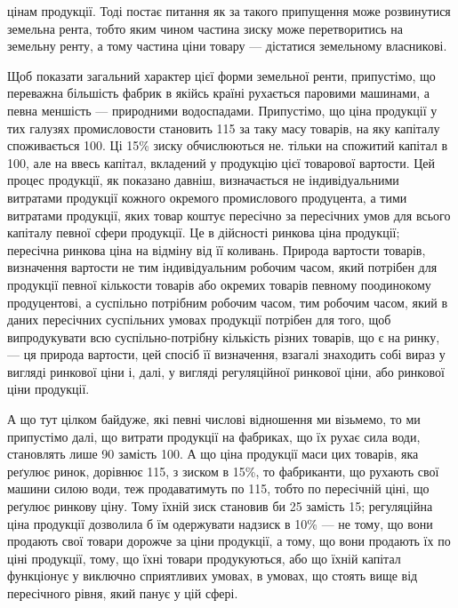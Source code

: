 \parcont{}  %
цінам продукції. Тоді постає питання як за такого припущення може розвинутися
земельна рента, тобто яким чином частина зиску може перетворитись на земельну
ренту, а тому частина ціни товару — дістатися земельному власникові.

Щоб показати загальний характер цієї форми земельної ренти, припустімо,
що переважна більшість фабрик в якійсь країні рухається паровими машинами,
а певна меншість — природними водоспадами. Припустімо, що ціна продукції
у тих галузях промисловости становить 115 за таку масу товарів, на яку капіталу
споживається 100. Ці 15\% зиску обчислюються не. тільки на спожитий капітал
в 100, але на ввесь капітал, вкладений у продукцію цієї товарової вартости.
Цей процес продукції, як показано давніш, визначається не індивідуальними
витратами продукції кожного окремого промислового продуцента, а тими витратами
продукції, яких товар коштує пересічно за пересічних умов для всього капіталу
певної сфери продукції. Це в дійсності ринкова ціна продукції; пересічна ринкова
ціна на відміну від її коливань. Природа вартости товарів, визначення вартости
не тим індивідуальним робочим часом, який потрібен для продукції певної
кількости товарів або окремих товарів певному поодинокому продуцентові, а
суспільно потрібним робочим часом, тим робочим часом, який в даних пересічних
суспільних умовах продукції потрібен для того, щоб випродукувати всю суспільно-потрібну
кількість різних товарів, що є на ринку, — ця природа вартости,
цей спосіб її визначення, взагалі знаходить собі вираз у вигляді ринкової ціни
і, далі, у вигляді регуляційної ринкової ціни, або ринкової ціни продукції.

А що тут цілком байдуже, які певні числові відношення ми візьмемо, то ми
припустімо далі, що витрати продукції на фабриках, що їх рухає сила води,
становлять лише 90 замість 100. А що ціна продукції маси цих товарів, яка
реґулює ринок, дорівнює 115, з зиском в 15\%, то фабриканти, що рухають
свої машини силою води, теж продаватимуть по 115, тобто по пересічній ціні,
що реґулює ринкову ціну. Тому їхній зиск становив би 25 замість 15; регуляційна
ціна продукції дозволила б їм одержувати надзиск в 10\% — не тому, що вони
продають свої товари дорожче за ціни продукції, а тому, що вони продають
їх по ціні продукції, тому, що їхні товари продукуються, або що їхній капітал
функціонує у виключно сприятливих умовах, в умовах, що стоять вище від пересічного
рівня, який панує у цій сфері.

